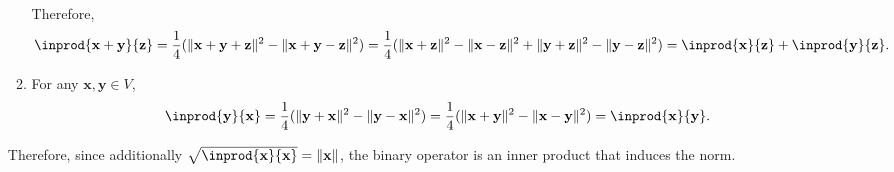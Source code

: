 \documentclass{huhtakm-template-book-v2}
\begin{document}
\begin{proofing}
\begin{itemize}
\begin{enumerate}
\begin{align*}
                \end{align*}
                Therefore,
                \begin{equation*}
                    \inprod{\mathbf{x}+\mathbf{y}}{\mathbf{z}} = \frac{1}{4}(\norm{\mathbf{x}+\mathbf{y}+\mathbf{z}}^{2} - \norm{\mathbf{x}+\mathbf{y}-\mathbf{z}}^{2}) = \frac{1}{4}(\norm{\mathbf{x}+\mathbf{z}}^{2} - \norm{\mathbf{x}-\mathbf{z}}^{2} + \norm{\mathbf{y}+\mathbf{z}}^{2} - \norm{\mathbf{y}-\mathbf{z}}^{2}) = \inprod{\mathbf{x}}{\mathbf{z}} + \inprod{\mathbf{y}}{\mathbf{z}}.
                \end{equation*}
                \item For any $\mathbf{x}, \mathbf{y} \in V$,
                \begin{equation*}
                    \inprod{\mathbf{y}}{\mathbf{x}} = \frac{1}{4}(\norm{\mathbf{y}+\mathbf{x}}^{2} - \norm{\mathbf{y}-\mathbf{x}}^{2}) = \frac{1}{4}(\norm{\mathbf{x}+\mathbf{y}}^{2} - \norm{\mathbf{x}-\mathbf{y}}^{2}) = \inprod{\mathbf{x}}{\mathbf{y}}.
                \end{equation*}
            \end{enumerate}
            Therefore, since additionally $\sqrt{\inprod{\mathbf{x}}{\mathbf{x}}} = \norm{\mathbf{x}}$, the binary operator is an inner product that induces the norm.
        \end{itemize}
    \end{proofing}
    \newpage
\end{document}
